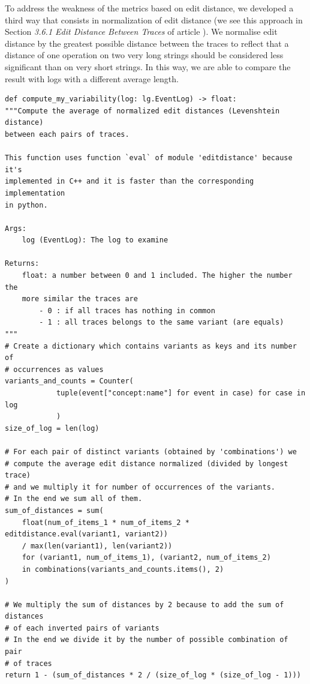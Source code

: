 \documentclass[12pt]{article}
\newenvironment{code}{\captionsetup{type=listing}}{}
\begin{document}
To address the weakness of the metrics based on edit distance, we developed a third way that consists in normalization of edit distance (we see this approach in Section \textit{3.6.1 Edit Distance Between Traces} of article \cite{ARTICLE:1}).  We normalise edit distance by the greatest possible distance between the traces to reflect that a distance of one operation on two very long strings should be considered less significant than on very short strings. In this way, we are able to compare the result with logs with a different average length.
\begin{code}
	\label{code:code3}
	\begin{verbatim}
def compute_my_variability(log: lg.EventLog) -> float:
"""Compute the average of normalized edit distances (Levenshtein distance)
between each pairs of traces.

This function uses function `eval` of module 'editdistance' because it's
implemented in C++ and it is faster than the corresponding implementation
in python.

Args:
	log (EventLog): The log to examine

Returns:
	float: a number between 0 and 1 included. The higher the number the
	more similar the traces are
		- 0 : if all traces has nothing in common
		- 1 : all traces belongs to the same variant (are equals)
"""
# Create a dictionary which contains variants as keys and its number of
# occurrences as values
variants_and_counts = Counter(
			tuple(event["concept:name"] for event in case) for case in log
			)
size_of_log = len(log)

# For each pair of distinct variants (obtained by 'combinations') we
# compute the average edit distance normalized (divided by longest trace)
# and we multiply it for number of occurrences of the variants.
# In the end we sum all of them.
sum_of_distances = sum(
	float(num_of_items_1 * num_of_items_2 * editdistance.eval(variant1, variant2))
	/ max(len(variant1), len(variant2))
	for (variant1, num_of_items_1), (variant2, num_of_items_2)
	in combinations(variants_and_counts.items(), 2)
)

# We multiply the sum of distances by 2 because to add the sum of distances
# of each inverted pairs of variants
# In the end we divide it by the number of possible combination of pair
# of traces
return 1 - (sum_of_distances * 2 / (size_of_log * (size_of_log - 1)))
	\end{verbatim}
\end{code}
\end{document}
